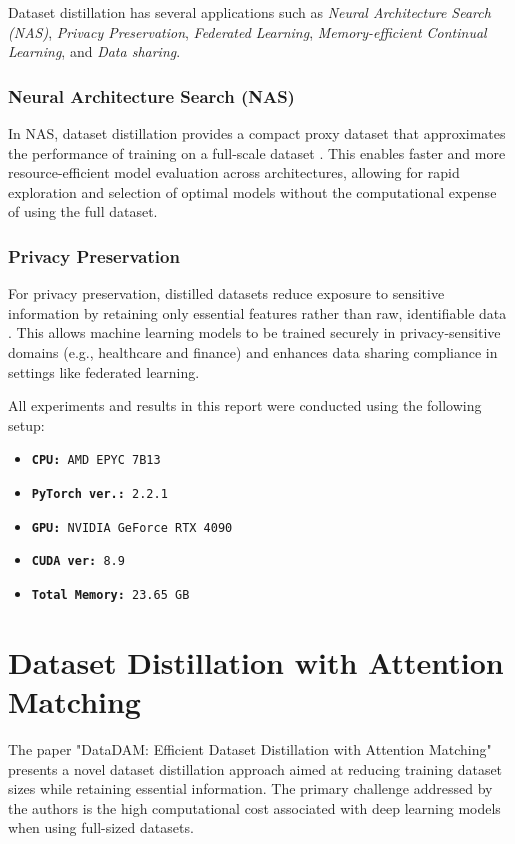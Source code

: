 \documentclass[conference, compsoc]{IEEEtran}
\begin{document}
	Dataset distillation has several applications such as \textit{Neural Architecture Search (NAS)}, \textit{Privacy Preservation}, \textit{Federated Learning}, \textit{Memory-efficient Continual Learning}, and \textit{Data sharing}.
	
	\subsubsection*{Neural Architecture Search (NAS)}
	In NAS, dataset distillation provides a compact proxy dataset that approximates the performance of training on a full-scale dataset \cite{white2023neuralarchitecturesearchinsights}. This enables faster and more resource-efficient model evaluation across architectures, allowing for rapid exploration and selection of optimal models without the computational expense of using the full dataset.
	
	\subsubsection*{Privacy Preservation}
	For privacy preservation, distilled datasets reduce exposure to sensitive information by retaining only essential features rather than raw, identifiable data \cite{dong2022privacyfreedoesdataset}. This allows machine learning models to be trained securely in privacy-sensitive domains (e.g., healthcare and finance) and enhances data sharing compliance in settings like federated learning.
	
	All experiments and results in this report were conducted using the following setup: \hfill
	
	\begin{itemize}
		\item \texttt{\textbf{CPU:} AMD EPYC 7B13}
		\item \texttt{\textbf{PyTorch ver.:} 2.2.1}
		\item \texttt{\textbf{GPU:} NVIDIA GeForce RTX 4090}
		\item \texttt{\textbf{CUDA ver:} 8.9}
		\item \texttt{\textbf{Total Memory:} 23.65 GB}
	\end{itemize}	
	
	\section{Dataset Distillation with Attention Matching}
	The paper "DataDAM: Efficient Dataset Distillation with Attention Matching" \cite{sajedi2023datadamefficientdatasetdistillation} presents a novel dataset distillation approach aimed at reducing training dataset sizes while retaining essential information. The primary challenge addressed by the authors is the high computational cost associated with deep learning models when using full-sized datasets.
	
\end{document}
